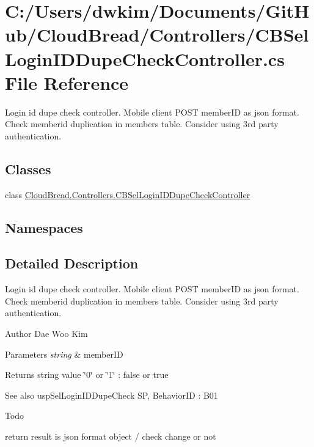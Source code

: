 \hypertarget{a00147}{}\section{C\+:/\+Users/dwkim/\+Documents/\+Git\+Hub/\+Cloud\+Bread/\+Controllers/\+C\+B\+Sel\+Login\+I\+D\+Dupe\+Check\+Controller.cs File Reference}
\label{a00147}


Login id dupe check controller. Mobile client P\+O\+ST member\+ID as json format. ~\newline
Check memberid duplication in members table. Consider using 3rd party authentication.  


\subsection*{Classes}
\begin{DoxyCompactItemize}
\item 
class \hyperlink{a00035}{Cloud\+Bread.\+Controllers.\+C\+B\+Sel\+Login\+I\+D\+Dupe\+Check\+Controller}
\end{DoxyCompactItemize}
\subsection*{Namespaces}
\begin{DoxyCompactItemize}
\end{DoxyCompactItemize}


\subsection{Detailed Description}
Login id dupe check controller. Mobile client P\+O\+ST member\+ID as json format. ~\newline
Check memberid duplication in members table. Consider using 3rd party authentication. 

\begin{DoxyAuthor}{Author}
Dae Woo Kim 
\end{DoxyAuthor}

\begin{DoxyParams}{Parameters}
{\em string} & member\+ID \\
\hline
\end{DoxyParams}
\begin{DoxyReturn}{Returns}
string value \char`\"{}0\char`\"{} or \char`\"{}1\char`\"{} \+: false or true 
\end{DoxyReturn}
\begin{DoxySeeAlso}{See also}
usp\+Sel\+Login\+I\+D\+Dupe\+Check SP, Behavior\+ID \+: B01 
\end{DoxySeeAlso}
\begin{DoxyRefDesc}{Todo}
\item[\hyperlink{a00001__todo000013}{Todo}]return result is json format object / check change or not \end{DoxyRefDesc}
